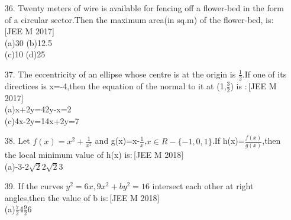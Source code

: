 \documentclass[journal,12pt,twocolumn]{IEEEtran}
\theoremstyle{remark}
\begin{document}
\begin{enumerate}
{(c)}($\frac{1}{2},\frac{1}{2}$)\hspace{2cm}{(d)}($\frac{1}{2},\frac{-1}{3}$)\\
\item[36.] Twenty meters of wire is available for fencing off a flower-bed in the form of a circular sector.Then the maximum area(in sq.m) of the flower-bed, is$:$\hfill[JEE M 2017]\\
{(a)}30  \hspace{2cm}                    {(b)}12.5\\
{(c)}10  \hspace{2cm}                    {(d)}25\\
\item[37.]The eccentricity of an ellipse whose centre is at the origin is $\frac{1}{2}$.If one of its directices is x=-4,then the equation of the normal to it at (1,$\frac{3}{2}$) is $:$\hfill[JEE M 2017]\\
{(a)}x+2y=4\hspace{2cm}{(b)}2y-x=2\\
{(c)}4x-2y=1\hspace{2cm}{(d)}4x+2y=7\\
\item[38.] Let $f(x)=x^{2}+\frac{1}{x^2}$ and g(x)=x-$\frac{1}{x}$,$x \in R-{\{-1,0,1}\}$.If h(x)=$\frac{f(x)}{g(x)}$,then the local minimum value of h(x) is$:$\hfill[JEE M 2018]\\
{(a)}-3\hspace{0.5cm}{(b)}-2$\sqrt{2}$\hspace{0.5cm}{(c)}2$\sqrt{2}$\hspace{0.5cm}{(d)}3\\
\item[39.] If the curves $y^2=6x,9x^2+by^2=16$ intersect each other at right angles,then the value of b is$:$\hfill[JEE M 2018]\\
{(a)}$\frac{7}{2}$\hspace{1cm}{(b)}4\hspace{1cm}{(c)}$\frac{9}{2}$\hspace{1cm}{(d)}6

\end{enumerate}\
\end{document}
